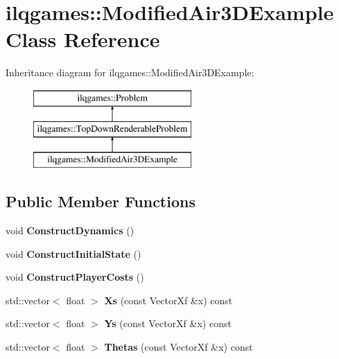 \hypertarget{classilqgames_1_1_modified_air3_d_example}{}\section{ilqgames\+:\+:Modified\+Air3\+D\+Example Class Reference}
\label{classilqgames_1_1_modified_air3_d_example}
Inheritance diagram for ilqgames\+:\+:Modified\+Air3\+D\+Example\+:\begin{figure}[H]
\begin{center}
\leavevmode
\includegraphics[height=3.000000cm]{classilqgames_1_1_modified_air3_d_example}
\end{center}
\end{figure}
\subsection*{Public Member Functions}
\begin{DoxyCompactItemize}
\item 
void {\bfseries Construct\+Dynamics} ()\hypertarget{classilqgames_1_1_modified_air3_d_example_a21686204e1cee37b1d1d45a474fa62b9}{}\label{classilqgames_1_1_modified_air3_d_example_a21686204e1cee37b1d1d45a474fa62b9}

\item 
void {\bfseries Construct\+Initial\+State} ()\hypertarget{classilqgames_1_1_modified_air3_d_example_a863c3c9aefa9c74e8010971f30e56225}{}\label{classilqgames_1_1_modified_air3_d_example_a863c3c9aefa9c74e8010971f30e56225}

\item 
void {\bfseries Construct\+Player\+Costs} ()\hypertarget{classilqgames_1_1_modified_air3_d_example_a3b54cec014f06bee422d135405fed4cb}{}\label{classilqgames_1_1_modified_air3_d_example_a3b54cec014f06bee422d135405fed4cb}

\item 
std\+::vector$<$ float $>$ {\bfseries Xs} (const Vector\+Xf \&x) const \hypertarget{classilqgames_1_1_modified_air3_d_example_aaf11e69e340b82dfcda4f75eaf6b0f1f}{}\label{classilqgames_1_1_modified_air3_d_example_aaf11e69e340b82dfcda4f75eaf6b0f1f}

\item 
std\+::vector$<$ float $>$ {\bfseries Ys} (const Vector\+Xf \&x) const \hypertarget{classilqgames_1_1_modified_air3_d_example_a20f8fee4a979499996bac692e529cddc}{}\label{classilqgames_1_1_modified_air3_d_example_a20f8fee4a979499996bac692e529cddc}

\item 
std\+::vector$<$ float $>$ {\bfseries Thetas} (const Vector\+Xf \&x) const \hypertarget{classilqgames_1_1_modified_air3_d_example_ad27e16664a208a9ba05e6c1fc8dfa388}{}\label{classilqgames_1_1_modified_air3_d_example_ad27e16664a208a9ba05e6c1fc8dfa388}

\end{DoxyCompactItemize}
